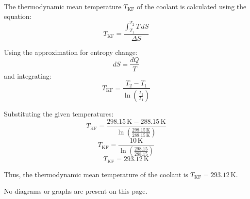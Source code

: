 The thermodynamic mean temperature \(T_{\text{KF}}\) of the coolant is calculated using the equation:  
\[
T_{\text{KF}} = \frac{\int_{T_1}^{T_2} T \, dS}{\Delta S}
\]  

Using the approximation for entropy change:  
\[
dS = \frac{dQ}{T}
\]  
and integrating:  
\[
T_{\text{KF}} = \frac{T_2 - T_1}{\ln \left( \frac{T_2}{T_1} \right)}
\]  

Substituting the given temperatures:  
\[
T_{\text{KF}} = \frac{298.15 \, \text{K} - 288.15 \, \text{K}}{\ln \left( \frac{298.15 \, \text{K}}{288.15 \, \text{K}} \right)}
\]  
\[
T_{\text{KF}} = \frac{10 \, \text{K}}{\ln \left( \frac{298.15}{288.15} \right)}
\]  
\[
T_{\text{KF}} = 293.12 \, \text{K}
\]  

Thus, the thermodynamic mean temperature of the coolant is \(T_{\text{KF}} = 293.12 \, \text{K}\).  

No diagrams or graphs are present on this page.